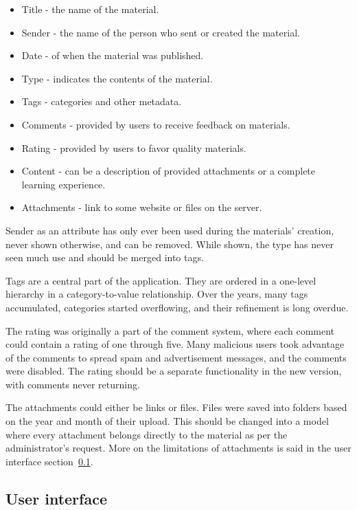 \documentclass[
  digital,     %
  oneside,     %
  nosansbold,  %
  colorbold, %
  lof,         %
  lot,         %
]{fithesis4}
\begin{document}
\begin{itemize}
	\item Title - the name of the material.
	\item Sender - the name of the person who sent or created the material.
	\item Date - of when the material was published.
	\item Type - indicates the contents of the material.
	\item Tags - categories and other metadata.
	\item Comments - provided by users to receive feedback on materials.
	\item Rating - provided by users to favor quality materials.
	\item Content - can be a description of provided attachments or a complete learning experience.
	\item Attachments - link to some website or files on the server.
\end{itemize}

Sender as an attribute has only ever been used during the materials' creation, never shown otherwise, and can be removed. While shown, the type has never seen much use and should be merged into tags.

Tags are a central part of the application. They are ordered in a one-level hierarchy in a category-to-value relationship. Over the years, many tags accumulated, categories started overflowing, and their refinement is long overdue.

The rating was originally a part of the comment system, where each comment could contain a rating of one through five. Many malicious users took advantage of the comments to spread spam and advertisement messages, and the comments were disabled. The rating should be a separate functionality in the new version, with comments never returning.

The attachments could either be links or files. Files were saved into folders based on the year and month of their upload. This should be changed into a model where every attachment belongs directly to the material as per the administrator's request. More on the limitations of attachments is said in the user interface section~\ref{subsect:plugin-ui}.

\subsection{User interface}
\label{subsect:plugin-ui}
\end{document}
